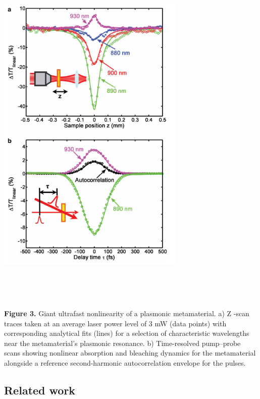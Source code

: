 \documentclass[]{article}
\begin{document}
\includegraphics[width=9cm,height=18cm]{image/001_03.png}\\
\textbf{Figure 3.} Giant ultrafast nonlinearity of a plasmonic
metamaterial. a) Z -scan traces taken at an average laser power level of
3 mW (data points) with corresponding analytical fits (lines) for a
selection of characteristic wavelengths near the metamaterial's
plasmonic resonance. b) Time-resolved pump--probe scans showing
nonlinear absorption and bleaching dynamics for the metamaterial
alongside a reference second-harmonic autocorrelation envelope for the
pulses.

\subsection{Related work}\label{related-work}
\end{document}
